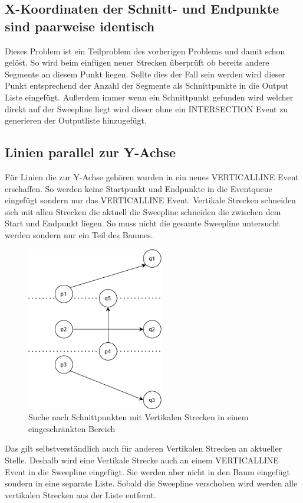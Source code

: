 \documentclass[conference]{IEEEtran}
\begin{document}
	\subsection{X-Koordinaten der Schnitt- und Endpunkte sind paarweise identisch}
	Dieses Problem ist ein Teilproblem des vorherigen Problems und damit schon gelöst.
	So wird beim einfügen neuer Strecken überprüft ob bereits andere Segmente an diesem Punkt liegen. Sollte dies der Fall sein werden wird dieser Punkt entsprechend der Anzahl der Segmente als Schnittpunkte in die Output Liste eingefügt. Außerdem immer wenn ein Schnittpunkt gefunden wird welcher direkt auf der Sweepline liegt wird dieser ohne ein INTERSECTION Event zu generieren der Outputliste hinzugefügt.
	
	\subsection{Linien parallel zur Y-Achse}
	Für Linien die zur Y-Achse gehören wurden in ein neues VERTICALLINE Event erschaffen. So werden keine Startpunkt und Endpunkte in die Eventqueue eingefügt sondern nur das VERTICALLINE Event.
	Vertikale Strecken schneiden sich mit allen Strecken die aktuell die Sweepline schneiden die zwischen dem Start und Endpunkt liegen. So muss nicht die gesamte Sweepline untersucht werden sondern nur ein Teil des Baumes.
	\begin{figure}[h]
		\begin{center}
			\includegraphics[width=6cm]{Vertikal.png}
			\caption{Suche nach Schnittpunkten mit Vertikalen Strecken in einem eingeschränkten Bereich}
			\label{figure_3}
		\end{center}
	\end{figure}
	Das gilt selbstverständlich auch für anderen Vertikalen Strecken an aktueller Stelle. Deshalb wird eine Vertikale Strecke auch an einem VERTICALLINE Event in die Sweepline eingefügt. Sie werden aber nicht in den Baum eingefügt sondern in eine separate Liste. Sobald die Sweepline verschoben wird werden alle vertikalen Strecken aus der Liste entfernt.
		
\end{document}
